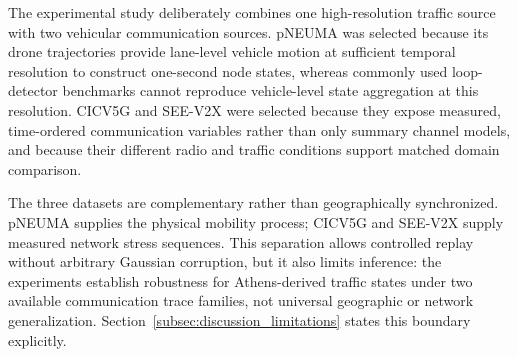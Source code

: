 \documentclass[pdflatex,sn-mathphys-num]{sn-jnl}%
\newenvironment{changed}{}{}
\theoremstyle{thmstyleone}%
\theoremstyle{thmstyletwo}%
\theoremstyle{thmstylethree}%
\begin{document}
\begin{changed}
The experimental study deliberately combines one high-resolution traffic source with two vehicular communication sources. pNEUMA was selected because its drone trajectories provide lane-level vehicle motion at sufficient temporal resolution to construct one-second node states, whereas commonly used loop-detector benchmarks cannot reproduce vehicle-level state aggregation at this resolution. CICV5G and SEE-V2X were selected because they expose measured, time-ordered communication variables rather than only summary channel models, and because their different radio and traffic conditions support matched domain comparison.

The three datasets are complementary rather than geographically synchronized. pNEUMA supplies the physical mobility process; CICV5G and SEE-V2X supply measured network stress sequences. This separation allows controlled replay without arbitrary Gaussian corruption, but it also limits inference: the experiments establish robustness for Athens-derived traffic states under two available communication trace families, not universal geographic or network generalization. Section~\ref{subsec:discussion_limitations} states this boundary explicitly.
\end{changed}
\end{document}
